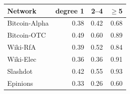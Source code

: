 \begin{tabular}{@{}lrrr@{}}
\toprule
Network & degree 1 & 2--4 & $\ge$5 \\
\midrule
Bitcoin-Alpha & 0.38 & 0.42 & 0.68 \\
Bitcoin-OTC & 0.49 & 0.60 & 0.89 \\
Wiki-RfA & 0.39 & 0.52 & 0.84 \\
Wiki-Elec & 0.36 & 0.36 & 0.91 \\
Slashdot & 0.42 & 0.55 & 0.93 \\
Epinions & 0.33 & 0.26 & 0.60 \\
\bottomrule
\end{tabular}
